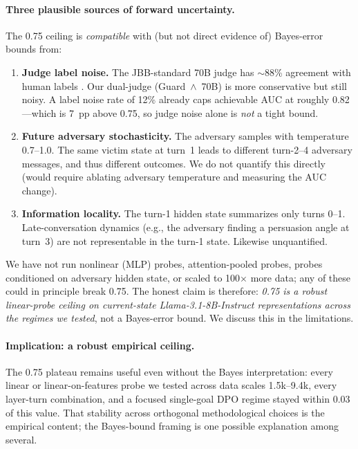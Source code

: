 \documentclass[11pt]{article}
\begin{document}
\paragraph{Three plausible sources of forward uncertainty.}
The 0.75 ceiling is \emph{compatible} with (but not direct evidence of) Bayes-error bounds from:
\begin{enumerate}[leftmargin=*]
  \item \textbf{Judge label noise.} The JBB-standard 70B judge has $\sim$88\% agreement with human labels \citep{chao2024jailbreakbench}. Our dual-judge (Guard~$\land$~70B) is more conservative but still noisy. A label noise rate of 12\% already caps achievable AUC at roughly 0.82---which is 7~pp above 0.75, so judge noise alone is \emph{not} a tight bound.
  \item \textbf{Future adversary stochasticity.} The adversary samples with temperature 0.7--1.0. The same victim state at turn~1 leads to different turn-2--4 adversary messages, and thus different outcomes. We do not quantify this directly (would require ablating adversary temperature and measuring the AUC change).
  \item \textbf{Information locality.} The turn-1 hidden state summarizes only turns 0--1. Late-conversation dynamics (e.g., the adversary finding a persuasion angle at turn~3) are not representable in the turn-1 state. Likewise unquantified.
\end{enumerate}
We have not run nonlinear (MLP) probes, attention-pooled probes, probes conditioned on adversary hidden state, or scaled to 100$\times$ more data; any of these could in principle break 0.75. The honest claim is therefore: \emph{0.75 is a robust linear-probe ceiling on current-state Llama-3.1-8B-Instruct representations across the regimes we tested}, not a Bayes-error bound. We discuss this in the limitations.

\paragraph{Implication: a robust empirical ceiling.}
The 0.75 plateau remains useful even without the Bayes interpretation: every linear or linear-on-features probe we tested across data scales 1.5k--9.4k, every layer-turn combination, and a focused single-goal DPO regime stayed within 0.03 of this value. That stability across orthogonal methodological choices is the empirical content; the Bayes-bound framing is one possible explanation among several.

\end{document}
